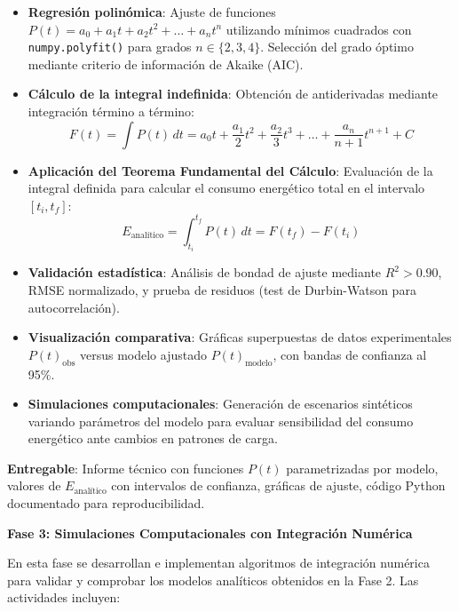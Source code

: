 \begin{itemize}
    \item \textbf{Regresión polinómica}: Ajuste de funciones $P(t) = a_0 + a_1 t + a_2 t^2 + \ldots + a_n t^n$ utilizando mínimos cuadrados con \texttt{numpy.polyfit()} para grados $n \in \{2, 3, 4\}$. Selección del grado óptimo mediante criterio de información de Akaike (AIC).
    
    \item \textbf{Cálculo de la integral indefinida}: Obtención de antiderivadas mediante integración término a término:
    \[
    F(t) = \int P(t) \, dt = a_0 t + \frac{a_1}{2} t^2 + \frac{a_2}{3} t^3 + \ldots + \frac{a_n}{n+1} t^{n+1} + C
    \]
    
    \item \textbf{Aplicación del Teorema Fundamental del Cálculo}: Evaluación de la integral definida para calcular el consumo energético total en el intervalo $[t_i, t_f]$:
    \[
    E_{\text{analítico}} = \int_{t_i}^{t_f} P(t) \, dt = F(t_f) - F(t_i)
    \]
    
    \item \textbf{Validación estadística}: Análisis de bondad de ajuste mediante $R^2 > 0.90$, RMSE normalizado, y prueba de residuos (test de Durbin-Watson para autocorrelación).
    
    \item \textbf{Visualización comparativa}: Gráficas superpuestas de datos experimentales $P(t)_{\text{obs}}$ versus modelo ajustado $P(t)_{\text{modelo}}$, con bandas de confianza al 95\%.
    
    \item \textbf{Simulaciones computacionales}: Generación de escenarios sintéticos variando parámetros del modelo para evaluar sensibilidad del consumo energético ante cambios en patrones de carga.
\end{itemize}

\textbf{Entregable}: Informe técnico con funciones $P(t)$ parametrizadas por modelo, valores de $E_{\text{analítico}}$ con intervalos de confianza, gráficas de ajuste, código Python documentado para reproducibilidad.

\textbf{Fase 3: Simulaciones Computacionales con Integración Numérica}

En esta fase se desarrollan e implementan algoritmos de integración numérica para validar y comprobar los modelos analíticos obtenidos en la Fase 2. Las actividades incluyen:

